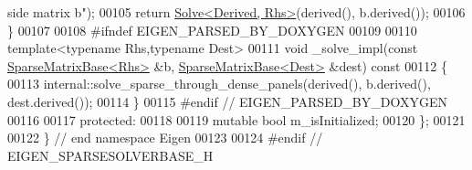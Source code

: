 \begin{DoxyCode}
{       side matrix b"});
00105       \textcolor{keywordflow}{return} \hyperlink{group___core___module_class_eigen_1_1_solve}{Solve<Derived, Rhs>}(derived(), b.derived());
00106     \}
00107     
00108 \textcolor{preprocessor}{    #ifndef EIGEN\_PARSED\_BY\_DOXYGEN}
00109 
00110     \textcolor{keyword}{template}<\textcolor{keyword}{typename} Rhs,\textcolor{keyword}{typename} Dest>
00111     \textcolor{keywordtype}{void} \_solve\_impl(\textcolor{keyword}{const} \hyperlink{group___sparse_core___module_class_eigen_1_1_sparse_matrix_base}{SparseMatrixBase<Rhs>} &b, 
      \hyperlink{group___sparse_core___module_class_eigen_1_1_sparse_matrix_base}{SparseMatrixBase<Dest>} &dest)\textcolor{keyword}{ const}
00112 \textcolor{keyword}{    }\{
00113       internal::solve\_sparse\_through\_dense\_panels(derived(), b.derived(), dest.derived());
00114     \}
00115 \textcolor{preprocessor}{    #endif // EIGEN\_PARSED\_BY\_DOXYGEN}
00116 
00117   \textcolor{keyword}{protected}:
00118     
00119     \textcolor{keyword}{mutable} \textcolor{keywordtype}{bool} m\_isInitialized;
00120 \};
00121 
00122 \} \textcolor{comment}{// end namespace Eigen}
00123 
00124 \textcolor{preprocessor}{#endif // EIGEN\_SPARSESOLVERBASE\_H}
\end{DoxyCode}
